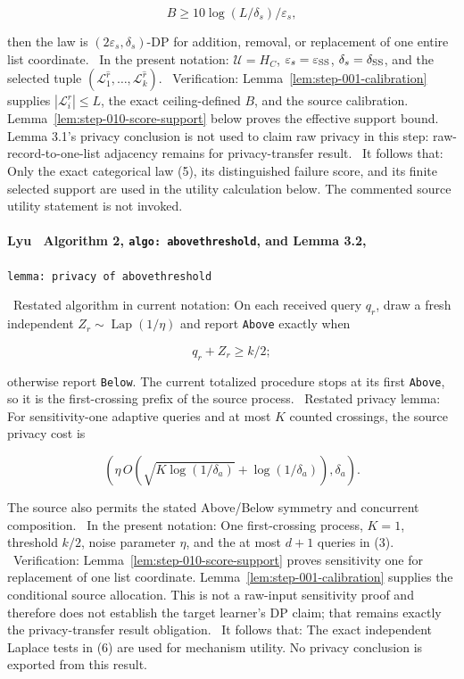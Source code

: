  \[
    B\geq10\log(L/\delta_s)/\varepsilon_s,
  \]

  then the law is \((2\varepsilon_s,\delta_s)\)-DP for addition, removal,
  or replacement of one entire list coordinate.
\noindent\textbullet\ In the present notation: \(\mathcal U=H_C\),
  \(\varepsilon_s=\varepsilon_{\rm SS}\),
  \(\delta_s=\delta_{\rm SS}\), and the selected tuple
  \((\mathcal L_1^{\widehat r},\ldots,
    \mathcal L_k^{\widehat r})\).
\noindent\textbullet\ Verification: Lemma~\ref{lem:step-001-calibration}
  supplies \(|\mathcal L_i^r|\leq L\), the exact ceiling-defined \(B\), and
  the source calibration. Lemma~\ref{lem:step-010-score-support} below
  proves the effective support bound. Lemma 3.1's privacy conclusion is not
  used to claim raw privacy in this step: raw-record-to-one-list adjacency
  remains for privacy-transfer result.
\noindent\textbullet\ It follows that: Only the exact categorical law (5), its distinguished
  failure score, and its finite selected support are used in the utility
  calculation below. The commented source utility statement is not invoked.

\paragraph{Lyu~\citep{lyu2025} Algorithm 2, \texttt{algo: abovethreshold}, and Lemma 3.2,}
\texttt{lemma: privacy of abovethreshold}

\noindent\textbullet\ Restated algorithm in current notation: On each received query \(q_r\),
  draw a fresh independent \(Z_r\sim\operatorname{Lap}(1/\eta)\) and report
  \texttt{Above} exactly when

  \[
    q_r+Z_r\geq k/2;
    \tag{6}
  \]

  otherwise report \texttt{Below}. The current totalized procedure stops at its
  first \texttt{Above}, so it is the first-crossing prefix of the source process.
\noindent\textbullet\ Restated privacy lemma: For sensitivity-one adaptive queries and at most
  \(K\) counted crossings, the source privacy cost is

  \[
    \left(
      \eta\,O(\sqrt{K\log(1/\delta_a)}+\log(1/\delta_a)),
      \delta_a
    \right).
  \]

  The source also permits the stated Above/Below symmetry and concurrent
  composition.
\noindent\textbullet\ In the present notation: One first-crossing process, \(K=1\), threshold
  \(k/2\), noise parameter \(\eta\), and the at most \(d+1\) queries in
  (3).
\noindent\textbullet\ Verification: Lemma~\ref{lem:step-010-score-support} proves
  sensitivity one for replacement of one list coordinate. Lemma~\ref{lem:step-001-calibration} supplies the conditional source
  allocation. This is not a raw-input sensitivity proof and therefore does
  not establish the target learner's DP claim; that remains exactly the
  privacy-transfer result obligation.
\noindent\textbullet\ It follows that: The exact independent Laplace tests in (6) are used for
  mechanism utility. No privacy conclusion is exported from this result.

